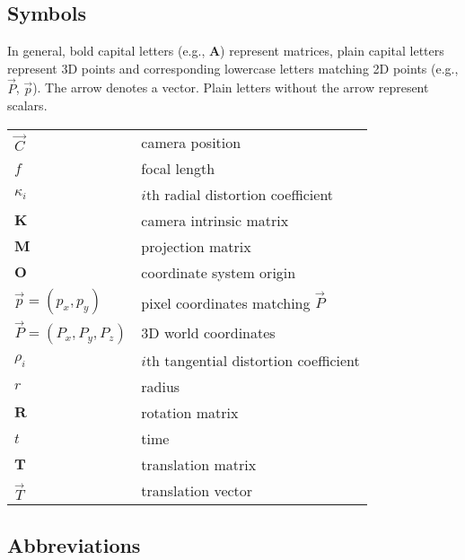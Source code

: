 
\subsection*{Symbols}

In general, bold capital letters (e.g., $\bm A$) represent matrices, plain capital letters represent 3D points and corresponding lowercase letters matching 2D points (e.g., $\vec P$, $\vec p$).
The arrow denotes a vector.
Plain letters without the arrow represent scalars.

\begin{tabular}{ll}
	$\vec C$ & camera position\\
	$f$ & focal length\\
	$\kappa_i$ & $i$th radial distortion coefficient\\
	$\bm K$ & camera intrinsic matrix\\
	$\bm M$ & projection matrix\\
	$\bm O$ & coordinate system origin\\
	$\vec p = (p_x, p_y)$ & pixel coordinates matching $\vec P$\\
	$\vec P = (P_x, P_y, P_z)$ & 3D world coordinates\\
	$\rho_i$ & $i$th tangential distortion coefficient\\
	$r$ & radius\\
	$\bm R$ & rotation matrix\\
	$t$ & time\\
	$\bm T$ & translation matrix\\
	$\vec T$ & translation vector\\
\end{tabular}
%
%

\subsection*{Abbreviations}

